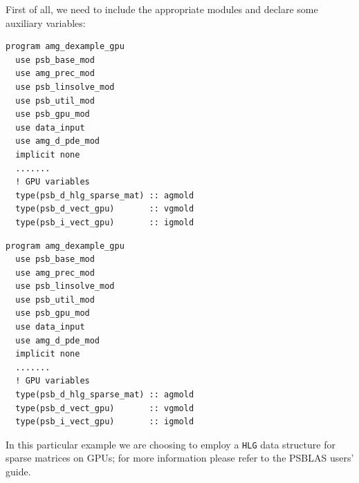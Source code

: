 First of all, we need to include the appropriate modules and
declare some auxiliary variables:
\begin{listing}[h!]
\ifpdf
\begin{verbatim}
program amg_dexample_gpu
  use psb_base_mod
  use amg_prec_mod
  use psb_linsolve_mod
  use psb_util_mod
  use psb_gpu_mod
  use data_input
  use amg_d_pde_mod
  implicit none
  .......
  ! GPU variables
  type(psb_d_hlg_sparse_mat) :: agmold
  type(psb_d_vect_gpu)       :: vgmold
  type(psb_i_vect_gpu)       :: igmold
\end{verbatim}
\else
\begin{center}
\begin{minipage}{.90\textwidth}
{\small
\begin{verbatim}
program amg_dexample_gpu
  use psb_base_mod
  use amg_prec_mod
  use psb_linsolve_mod
  use psb_util_mod
  use psb_gpu_mod
  use data_input
  use amg_d_pde_mod
  implicit none
  .......
  ! GPU variables
  type(psb_d_hlg_sparse_mat) :: agmold
  type(psb_d_vect_gpu)       :: vgmold
  type(psb_i_vect_gpu)       :: igmold

 \end{verbatim}
}
\end{minipage}
\end{center}
\fi
\caption{setup of a GPU-enabled test program part one.\label{fig:gpu-ex1}}
\end{listing}
In this particular example we are choosing to employ a \verb|HLG| data
structure for sparse matrices on GPUs; for more information please
refer to the PSBLAS users' guide.

